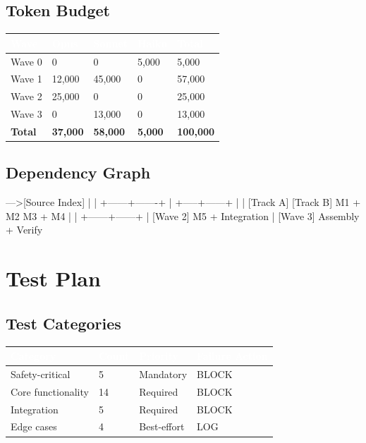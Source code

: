 \documentclass[11pt,letterpaper]{article}
\newcommand{\tableheader}[1]{\textbf{\sffamily\textcolor{white}{#1}}}
\begin{document}
\subsection{Token Budget}

\begin{center}
\begin{tabularx}{\textwidth}{L{3cm}C{2cm}C{2cm}C{2cm}C{2cm}}
\toprule
{}
\tableheader{Wave} & \tableheader{Opus} & \tableheader{Sonnet} & \tableheader{Haiku} & \tableheader{Total} \\
\midrule
Wave 0 & 0 & 0 & 5,000 & 5,000 \\
Wave 1 & 12,000 & 45,000 & 0 & 57,000 \\
Wave 2 & 25,000 & 0 & 0 & 25,000 \\
Wave 3 & 0 & 13,000 & 0 & 13,000 \\
\midrule
\textbf{Total} & \textbf{37,000} & \textbf{58,000} & \textbf{5,000} & \textbf{100,000} \\
\bottomrule
\end{tabularx}
\end{center}

\subsection{Dependency Graph}

\begin{asciibox}
[Schemas]--->[Source Index]
    |              |
    +------+-------+
           |
     +-----+------+
     |             |
  [Track A]    [Track B]
  M1 + M2      M3 + M4
     |             |
     +------+------+
            |
         [Wave 2]
       M5 + Integration
            |
         [Wave 3]
       Assembly + Verify
\end{asciibox}

\section{Test Plan}

\subsection{Test Categories}

\begin{center}
\begin{tabularx}{\textwidth}{L{3cm}C{1.5cm}C{1.5cm}C{2cm}}
\toprule
{}
\tableheader{Category} & \tableheader{Count} & \tableheader{Priority} & \tableheader{Failure Action} \\
\midrule
Safety-critical & 5 & Mandatory & BLOCK \\
Core functionality & 14 & Required & BLOCK \\
Integration & 5 & Required & BLOCK \\
Edge cases & 4 & Best-effort & LOG \\
\bottomrule
\end{tabularx}
\end{center}
\end{document}
